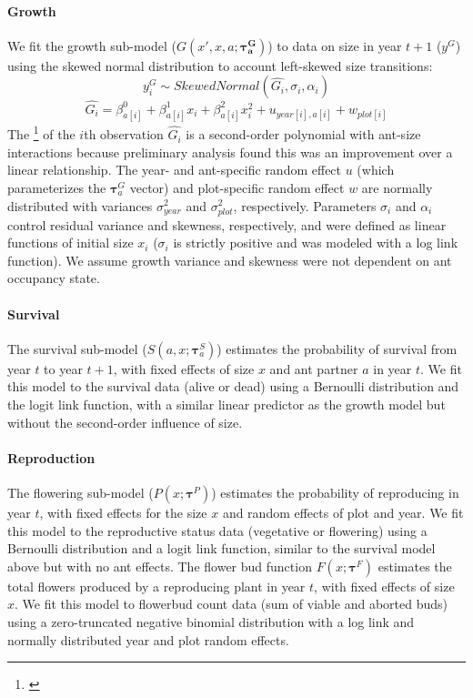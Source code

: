 \documentclass[11pt]{article}
\newcommand{\tom}[2]{{\color{red}{#1}}\footnote{\textit{\color{red}{#2}}}}
\begin{document}
\paragraph{Growth}
We fit the growth sub-model ($G(x',x,a;\pmb{\tau^G_{a}})$) to data on size in year $t+1$ ($y^G$) using the skewed normal distribution to account left-skewed size transitions:
$$y_i^G \sim Skewed Normal(\hat{G_i},\sigma_i,\alpha_i) $$
$$\hat{G_i} = \beta^0_{a[i]} + \beta^1_{a[i]} x_i + \beta^2_{a[i]} x_i^2 + u_{year[i],a[i]} + w_{plot[i]} $$
The \tom{mean}{I rewrote this for the skewed normal but I cannot remember if the location parameter is the mean, so you should double check this.} of the $i$th observation $\hat{G_i}$ is a second-order polynomial with ant-size interactions because  preliminary analysis found this was an improvement over a linear relationship. 
The year- and ant-specific random effect $u$ (which parameterizes the $\pmb{\tau}^G_{a}$ vector) and plot-specific random effect $w$ are normally distributed with variances $\sigma^2_{year}$ and $\sigma^2_{plot}$, respectively. 
Parameters $\sigma_i$ and $\alpha_i$  control residual variance and skewness, respectively, and were defined as linear functions of initial size $x_i$ ($\sigma_i$ is strictly positive and was modeled with a log link function). 
We assume growth variance and skewness were not dependent on ant occupancy state. 

\paragraph{Survival}
The survival sub-model ($S(a,x;\pmb{\tau}_{a}^{S})$) estimates the probability of survival from year $t$ to year $t+1$, with fixed effects of size $x$ and ant partner $a$ in year $t$.
We fit this model to the survival data (alive or dead) using a Bernoulli distribution and the logit link function, with a similar linear predictor as the growth model but without the second-order influence of size.

\paragraph{Reproduction}
The flowering sub-model ($P(x;\pmb{\tau}^{P})$) estimates the probability of reproducing in year $t$, with fixed effects for the size $x$ and random effects of plot and year.
We fit this model to the reproductive status data (vegetative or flowering) using a Bernoulli distribution and a logit link function, similar to the survival model above but with no ant effects.  
The flower bud function $F(x;\pmb{\tau}^{F})$ estimates the total flowers produced by a reproducing plant in year $t$, with fixed effects of size $x$. 
We fit this model to flowerbud count data (sum of viable and aborted buds) using a zero-truncated negative binomial distribution with a log link and normally distributed year and plot random effects.
\end{document}
